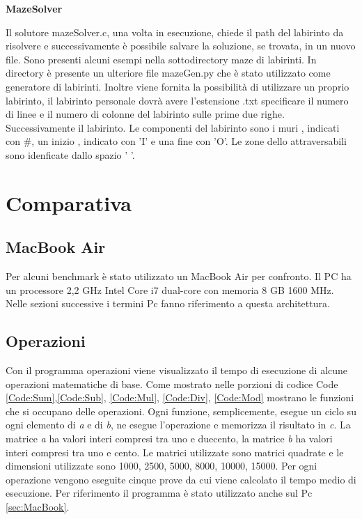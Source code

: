 \documentclass[12pt,a4paper]{report}
\begin{document}
\vspace{0.5cm}
\begin{large}
\textbf{MazeSolver}
\end{large}

Il solutore mazeSolver.c, una volta in esecuzione, chiede il path del labirinto da risolvere e successivamente è possibile salvare la soluzione, se trovata, in un nuovo file.  Sono presenti alcuni esempi nella sottodirectory maze di labirinti.
In directory è presente un ulteriore file mazeGen.py che è stato utilizzato come generatore di labirinti. 
Inoltre viene fornita la possibilità di utilizzare un proprio labirinto, il labirinto personale dovrà avere l'estensione .txt specificare il numero di linee e il numero di colonne del labirinto sulle prime due righe. Successivamente  il labirinto. Le componenti del labirinto sono i muri , indicati con \#, un inizio , indicato con 'I' e una fine con 'O'. Le zone dello attraversabili sono idenficate dallo spazio ' '.



\chapter{Comparativa}

\section*{MacBook Air}
\label{sec:MacBook}
Per alcuni benchmark è stato utilizzato un MacBook Air per confronto.  Il PC ha un processore 2,2 GHz Intel Core i7 dual-core con memoria 8 GB 1600 MHz. Nelle sezioni successive i termini Pc fanno riferimento a questa architettura.

\section{Operazioni}
	Con il programma operazioni viene visualizzato il tempo di esecuzione di alcune operazioni matematiche di base. Come mostrato nelle porzioni di codice Code \ref{Code:Sum},\ref{Code:Sub}, \ref{Code:Mul}, \ref{Code:Div}, \ref{Code:Mod} mostrano le funzioni che si occupano delle operazioni. Ogni funzione, semplicemente, esegue un ciclo su ogni elemento di \textit{a} e di \textit{b}, ne esegue l'operazione e memorizza il risultato in \textit{c}.  La matrice \textit{a} ha valori interi compresi tra uno e duecento,  la matrice \textit{b} ha valori interi compresi tra uno e cento. Le matrici utilizzate sono matrici quadrate e le dimensioni utilizzate sono 1000, 2500, 5000, 8000, 10000, 15000. Per ogni operazione vengono eseguite cinque prove da cui viene calcolato il tempo medio di esecuzione. 
	Per riferimento il programma è stato utilizzato anche sul Pc \ref{sec:MacBook}. 
	
\end{document}
